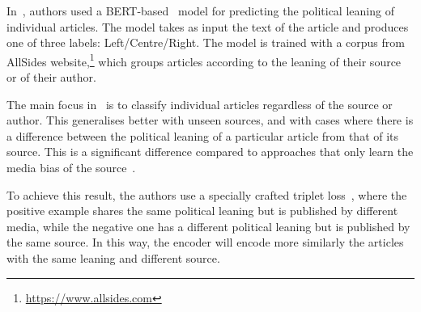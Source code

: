 

 

In~\citet{baly2020we}, authors used a BERT-based~\citep{devlin2018bert} model for predicting the political leaning of individual articles. The model takes as input the text of the article and produces one of three labels: Left/Centre/Right. The model is trained with a corpus from AllSides website,\footnote{\url{https://www.allsides.com}} which groups articles %
according to the leaning of their source or of their author.


The main focus in~\citet{baly2020we} is to classify individual articles regardless of the source or author. This generalises better with unseen sources, and with cases where there is a difference between the political leaning of a particular article from that of its source.
This is a significant difference compared to approaches that only learn the media bias of the source~\citep{baly2020written,biessmann2016automating}.

To achieve this result, the authors use a specially crafted triplet loss~\citep{schroff2015facenet}, where the positive example shares the same political leaning but is published by different media, while the negative one has a different political leaning but is published by the same source. In this way, the encoder will encode more similarly the articles with the same leaning and different source.

